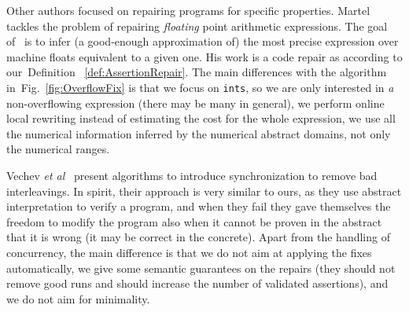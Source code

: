 \documentclass[10pt]{sigplanconf}
\newcommand{\refFig}[1]{Fig.~\ref{fig:#1}}
\newcommand{\refDef}[1]{Definition ~\ref{def:#1}}
\newcommand{\code}[1]{\texttt{#1}}
\begin{document}
Other authors focused on repairing programs for  specific properties.
Martel~\cite{Martel09} tackles the problem of repairing \emph{floating} point arithmetic expressions.
The goal of~\cite{Martel09} is to infer (a good-enough approximation of) the most precise expression over machine floats equivalent to a given one.
His work is a code repair as according to our~\refDef{AssertionRepair}.
The main differences with the algorithm in~\refFig{OverflowFix} is that we focus on \code{ints}, so we are only interested in \emph{a} non-overflowing expression (there may be many in general), we perform online local rewriting instead of estimating the cost for the whole expression, we use all the numerical information inferred by the numerical abstract domains, not only the numerical ranges.

Vechev \emph{et al}~\cite{VechevEtAl10} present algorithms to introduce synchronization to remove bad interleavings.
In spirit, their approach is very similar to ours, as they use abstract interpretation to verify a program, and when they fail they gave themselves the freedom to modify the program also when it cannot be proven in the abstract that it is wrong (it may be correct in the concrete).
Apart from the handling of concurrency, the main difference is that we do not aim at applying the fixes automatically, we give some semantic guarantees on the repairs (they should not remove good runs and should increase the number of validated assertions), and we do not aim for minimality.
\end{document}

